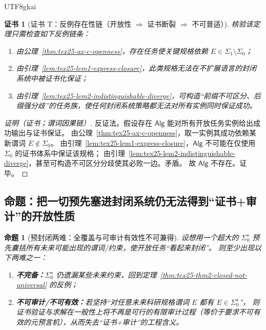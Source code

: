 \documentclass[12pt]{article}
\newtheorem{proposition}{命题}[section]
\newtheorem{Certificate}{证书}[section]
\begin{document}
\begin{CJK*}{UTF8}{gkai}
\begin{Certificate}[证书 T：反例存在性链（开放性 $\Rightarrow$ 证书断裂 $\Rightarrow$ 不可普适）]
\label{cert:tex25-thm2-closed-not-universal}
核验该定理只需检查如下反例链条：
\begin{enumerate}
  \item 由公理~\ref{thm:tex25-ax-c-openness}，存在任务使关键规格依赖 $E\in\Sigma_1\setminus\Sigma_0$；
  \item 由引理~\ref{lem:tex25-lem1-express-closure}，此类规格无法在不扩展语言的封闭系统中被证书化保证；
  \item 由引理~\ref{lem:tex25-lem2-indistinguishable-diverge}，可构造“前缀不可区分、后缀强分歧”的任务族，使任何封闭系统策略都无法对所有实例同时保证成功。
\end{enumerate}
\end{Certificate}

\begin{proof}[证明（证书；谓词因果链）]
反证法。假设存在 $\mathsf{Alg}$ 能对所有开放任务实例给出成功输出与证书保证。
由公理~\ref{thm:tex25-ax-c-openness}，取一实例其成功依赖某新谓词 $E\notin\Sigma_0$。
由引理~\ref{lem:tex25-lem1-express-closure}，$\mathsf{Alg}$ 不可能在仅使用 $\Sigma_0$ 的证书体系中保证该规格；
由引理~\ref{lem:tex25-lem2-indistinguishable-diverge}，甚至可构造不可区分分歧使其必败一边。矛盾。
故 $\mathsf{Alg}$ 不存在。证毕。
\end{proof}

\subsection{命题：把一切预先塞进封闭系统仍无法得到“证书+审计”的开放性质}
\label{subsec:tex25-preclosure-dilemma}

\begin{proposition}[预封闭两难：全覆盖与可审计有效性不可兼得]
\label{prop:tex25-preclosure-dilemma}
设想用一个超大的 $\Sigma_0^\star$ 预先囊括所有未来可能出现的谓词/约束，使开放任务“看起来封闭”。
则至少出现以下两难之一：
\begin{enumerate}
  \item \textbf{不完备：}$\Sigma_0^\star$ 仍遗漏某些未来约束，回到定理~\ref{thm:tex25-thm2-closed-not-universal} 的反例；
  \item \textbf{不可审计/不可有效：}若坚持“对任意未来科研规格谓词 $E$ 都有 $E\in\Sigma_0^\star$”，
  则证书验证与求解在一般性上将不再是可行的有限审计过程（等价于要求不可有效的元预言机），从而失去“证书+审计”的工程含义。
\end{enumerate}
\end{proposition}


\end{CJK*}
\end{document}
